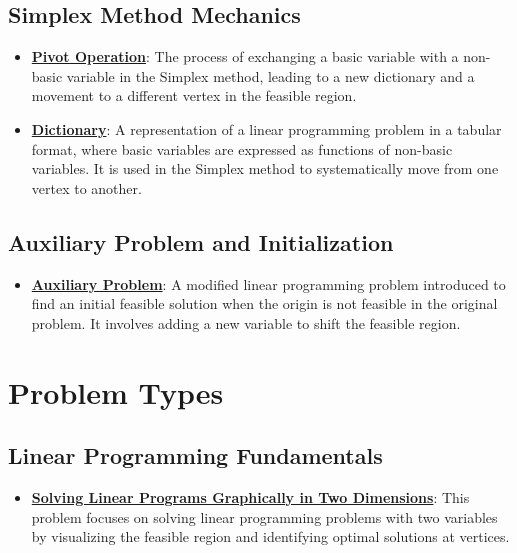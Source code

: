 \documentclass{article}%
\begin{document}
\subsection{Simplex Method Mechanics}%
\label{subsec:SimplexMethodMechanics}%
\begin{itemize}[leftmargin=*]%
\item \href{https://www.math.purdue.edu/~yipn/421/2024-08-27-ExSimplex.pdf#page=9}{\textbf{Pivot Operation}}: The process of exchanging a basic variable with a non-basic variable in the Simplex method, leading to a new dictionary and a movement to a different vertex in the feasible region.%
\item \href{https://www.math.purdue.edu/~yipn/421/2024-08-27-ExSimplex.pdf#page=26}{\textbf{Dictionary}}: A representation of a linear programming problem in a tabular format, where basic variables are expressed as functions of non-basic variables.  It is used in the Simplex method to systematically move from one vertex to another.%
\end{itemize}

%
\subsection{Auxiliary Problem and Initialization}%
\label{subsec:AuxiliaryProblemandInitialization}%
\begin{itemize}[leftmargin=*]%
\item \href{https://www.math.purdue.edu/~yipn/421/2024-08-27-ExSimplex.pdf#page=32}{\textbf{Auxiliary Problem}}: A modified linear programming problem introduced to find an initial feasible solution when the origin is not feasible in the original problem.  It involves adding a new variable to shift the feasible region.%
\end{itemize}

%
\section{Problem Types}%
\label{sec:ProblemTypes}%
\subsection{Linear Programming Fundamentals}%
\label{subsec:LinearProgrammingFundamentals}%
\begin{itemize}[leftmargin=*]%
\item \href{https://www.math.purdue.edu/~yipn/421/2024-08-27-ExSimplex.pdf#page=2}{\textbf{Solving Linear Programs Graphically in Two Dimensions}}: This problem focuses on solving linear programming problems with two variables by visualizing the feasible region and identifying optimal solutions at vertices.%
\end{itemize}
\end{document}
